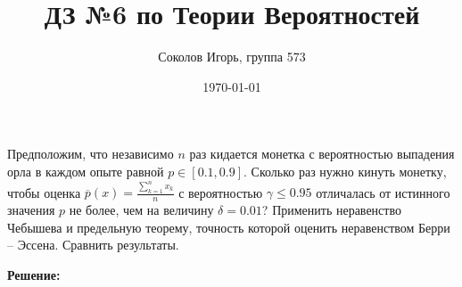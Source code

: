 \documentclass[a4paper,12pt]{article}
\author{Соколов Игорь, группа 573}
\title{ДЗ №6 по Теории Вероятностей }
\date{\today}
\newcommand{\fr}{\frac}
\newcommand{\ol}{\overline}
\begin{document}

\maketitle

\section{}
Предположим, что независимо $n$ раз кидается монетка с вероятностью выпадения
орла в каждом опыте равной $p \in [0.1, 0.9]$. Сколько раз нужно кинуть монетку, чтобы оценка ${\ol p(x)} = \fr{\sum_{k=1}^{n}x_k}{n}$ с вероятностью $\gamma \le 0.95$ отличалась от истинного значения $p$ не более, чем на величину $\delta = 0.01$? Применить неравенство Чебышева и предельную теорему, точность которой оценить неравенством Берри – Эссена. Сравнить результаты.

\textbf {Решение:}
\end{document}
